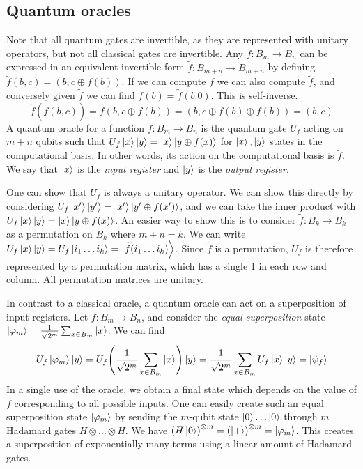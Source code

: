 \subsection{Quantum oracles}
Note that all quantum gates are invertible, as they are represented with unitary operators, but not all classical gates are invertible.
Any \( f \colon B_m \to B_n \) can be expressed in an equivalent invertible form \( \widetilde f \colon B_{m+n} \to B_{m+n} \) by defining \( \widetilde f(b,c) = (b, c \oplus f(b)) \).
If we can compute \( f \) we can also compute \( \widetilde f \), and conversely given \( \widetilde f \) we can find \( f(b) = \widetilde f(b.0) \).
This is self-inverse.
\[ \widetilde f(\widetilde f(b,c)) = \widetilde f(b, c \oplus f(b)) = (b, c \oplus f(b) \oplus f(b)) = (b, c) \]
A quantum oracle for a function \( f \colon B_m \to B_n \) is the quantum gate \( U_f \) acting on \( m + n \) qubits such that \( U_f \ket{x} \ket{y} = \ket{x} \ket{y \oplus f(x)} \) for \( \ket{x}, \ket{y} \) states in the computational basis.
In other words, its action on the computational basis is \( \widetilde f \).
We say that \( \ket{x} \) is the \emph{input register} and \( \ket{y} \) is the \emph{output register}.

One can show that \( U_f \) is always a unitary operator.
We can show this directly by considering \( U_f \ket{x'}\ket{y'} = \ket{x'}\ket{y' \oplus f(x')} \), and we can take the inner product with \( U_f \ket{x} \ket{y} = \ket{x} \ket{y \oplus f(x)} \).
An easier way to show this is to consider \( \widetilde f \colon B_k \to B_k \) as a permutation on \( B_k \) where \( m + n = k \).
We can write \( U_f \ket{x} \ket{y} = U_f \ket{i_1 \dots i_k} = \ket{\widetilde f(i_1 \dots i_k)} \).
Since \( \widetilde f \) is a permutation, \( U_f \) is therefore represented by a permutation matrix, which has a single 1 in each row and column.
All permutation matrices are unitary.

In contrast to a classical oracle, a quantum oracle can act on a superposition of input registers.
Let \( f \colon B_m \to B_n \), and consider the \emph{equal superposition} state \( \ket{\varphi_m} = \frac{1}{\sqrt{2^m}} \sum_{x \in B_m} \ket{x} \).
We can find
\[ U_f \ket{\varphi_m} \ket{y} = U_f \qty( \frac{1}{\sqrt{2^m}} \sum_{x \in B_m} \ket{x}) \ket{y} = \frac{1}{\sqrt{2^m}} \sum_{x \in B_m} U_f \ket{x} \ket{y} = \ket{\psi_f} \]
In a single use of the oracle, we obtain a final state which depends on the value of \( f \) corresponding to all possible inputs.
One can easily create such an equal superposition state \( \ket{\varphi_m} \) by sending the \( m \)-qubit state \( \ket{0} \dots \ket{0} \) through \( m \) Hadamard gates \( H \otimes \dots \otimes H \).
We have \( \qty(H \ket{0})^{\otimes m} = \qty(\ket{+})^{\otimes m} = \ket{\varphi_m} \).
This creates a superposition of exponentially many terms using a linear amount of Hadamard gates.

